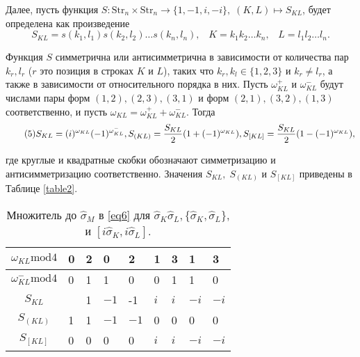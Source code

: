 \documentclass[a4paper]{report}
\begin{document}
Далее, пусть функция ${S:\mathrm{Str}_n\times\mathrm{Str}_n\rightarrow\{1,-1,i,-i\}, \; (K,L)\mapsto S_{KL}}$, будет определена как произведение
$${
            S_{KL} = s (k_1,l_1)s(k_2,l_2)\ldots s(k_n,l_n), \;\;\; K = k_1k_2\ldots k_n, \;\;\; L=l_1l_2\ldots l_n.
        }$$

Функция ${S}$ симметрична или антисимметрична в зависимости от количества пар ${k_r,l_r}$ (${r}$ это позиция в строках ${K}$ и ${L}$), таких что ${k_r,k_l\in\{1,2,3\}}$ и ${k_r\neq l_r}$, а также в зависимости от относительного порядка в них. Пусть ${\omega^+_{KL}}$ и ${\omega^-_{KL}}$ будут числами пары форм ${(1,2),(2,3),(3,1)}$ и форм ${(2,1),(3,2),(1,3)}$ соответственно, и пусть
${\omega_{KL} = \omega^+_{KL} + \omega^-_{KL}}$. \mbox{Тогда}
\begin{equation}\tag{\normalsize 5}\label{eq5}
    \small S_{KL} = (i)^{\omega_{KL}}(-1)^{\omega^-_{KL}},S_{(KL)} = \frac{S_{KL}}{2}(1+(-1)^{\omega_{KL}}),S_{[KL]}=\frac{S_{KL}}{2}(1-(-1)^{\omega_{KL}}),
\end{equation}

\noindent где круглые и квадратные скобки обозначают симметризацию и антисимметризацию соответственно. Значения ${S_{KL},\;S_{(KL)}}$ и ${S_{[KL]}}$ приведены в Таблице \ref{table2}.

\begin{table}[h!]
    \centering
    \begin{tabular}{ | c | P{1cm} | P{1cm} | P{1cm} | P{1cm} | P{1cm} | P{1cm} | P{1cm} | P{1cm} | }
        \hline
        ${\omega_{KL}\mathrm{mod4}}$     & 0 & 2 & 0      & 2      & 1     & 3     & 1      & 3      \\
        \hline
        ${\omega_{KL}^{-}\mathrm{mod4}}$ & 0 & 1 & 1      & 0      & 0     & 1     & 1      & 0      \\
        \hline\hline
        ${S_{KL}}$                       &   & 1 & ${-1}$ & -1     & ${i}$ & ${i}$ & ${-i}$ & ${-i}$ \\
        \hline
        ${S_{(KL)}}$                     & 1 & 1 & ${-1}$ & ${-1}$ & 0     & 0     & 0      & 0      \\
        \hline
        ${S_{[KL]}}$                     & 0 & 0 & 0      & 0      & ${i}$ & ${i}$ & ${-i}$ & ${-i}$ \\
        \hline
    \end{tabular}
    \caption{Множитель до ${\hat{\sigma}_M}$ в \eqref{eq6} для ${\hat{\sigma}_K\hat{\sigma}_L,\{\hat{\sigma}_K,\hat{\sigma}_L\}}$, и ${[i\hat{\sigma}_K,i\hat{\sigma}_L]}$.}\label{table1}
\end{table}
\end{document}
